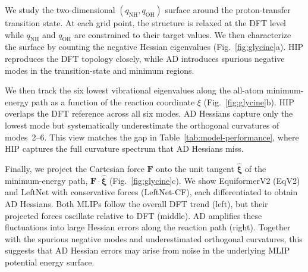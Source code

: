 \documentclass[pdflatex,sn-mathphys-num]{sn-jnl}%
\begin{document}
We study the two-dimensional \((q_{\mathrm{NH}}, q_{\mathrm{OH}})\) surface around the proton-transfer transition state. At each grid point, the structure is relaxed at the DFT level while \(q_{\mathrm{NH}}\) and \(q_{\mathrm{OH}}\) are constrained to their target values. We then characterize the surface by counting the negative Hessian eigenvalues
(Fig.~\ref{fig:glycine}a). HIP reproduces the DFT topology closely, while AD introduces spurious negative modes in the transition-state and minimum regions.

We then track the six lowest vibrational eigenvalues along the all-atom minimum-energy path as a function of the reaction coordinate $\xi$ (Fig.~\ref{fig:glycine}b). HIP overlaps the DFT reference across all six modes. AD Hessians capture only the lowest mode but systematically underestimate the orthogonal curvatures of modes~2--6. This view matches the gap in Table~\ref{tab:model-performance}, where HIP captures the full curvature spectrum that AD Hessians miss.

Finally, we project the Cartesian force \(\mathbf{F}\) onto the unit tangent \(\widehat{\bm{\xi}}\) of the minimum-energy path, \(\mathbf{F}\cdot\widehat{\bm{\xi}}\) (Fig.~\ref{fig:glycine}c). We show EquiformerV2 (EqV2) and LeftNet with conservative forces (LeftNet-CF), each differentiated to obtain AD Hessians. Both MLIPs follow the overall DFT trend (left), but their projected forces oscillate relative to DFT (middle). AD amplifies these fluctuations into large Hessian errors along the reaction path (right).
Together with the spurious negative modes and underestimated orthogonal curvatures, this suggests that AD Hessian errors may arise from noise in the underlying MLIP potential energy surface.
\end{document}
